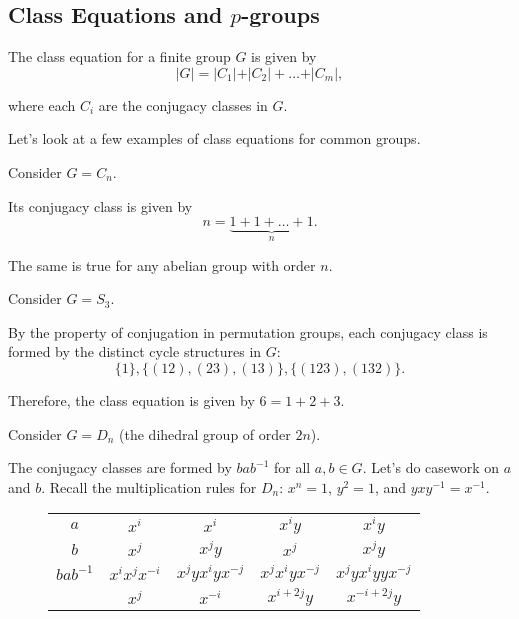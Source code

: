 \subsection{Class Equations and $p$-groups}

\begin{definition}

The \ac{class equation} for a finite group $G$ is given by 
\[\vert G\vert = \vert C_1\vert + \vert C_2 \vert + \hdots + \vert C_m\vert,\]

where each $C_i$ are the conjugacy classes in $G$. 
\end{definition}

Let's look at a few examples of class equations for common groups.
\begin{example}
\exlabel

Consider $G = C_n$. 
\end{example}

Its conjugacy class is given by
\[n = \underbrace{1 + 1 + \hdots + 1}_n.\]

The same is true for any abelian group with order $n$. 

\begin{example}
\exlabel

Consider $G = S_3$. 
\end{example}

By the property of conjugation in permutation groups, each conjugacy class is formed by the distinct cycle structures in $G$: 
\[\{1\}, \{(12), (23), (13)\}, \{(123), (132)\}.\]

Therefore, the class equation is given by $6 = 1+2+3$. 

\begin{example}
\exlabel

Consider $G = D_n$ (the dihedral group of order $2n$). 
\end{example}

The conjugacy classes are formed by $bab^{-1}$ for all $a,b\in G$. Let's do casework on $a$ and $b$. Recall the multiplication rules for $D_n$: $x^n = 1$, $y^2 = 1$, and $yxy^{-1} = x^{-1}$. 

\begin{figure}[h]
\centering
\begin{tabular}{|c|c|c|c|c|}

    $a$ & $x^i$ & $x^i$ & $x^iy$ & $x^iy$ \\

    $b$ & $x^j$ & $x^jy$ & $x^j$ & $x^jy$ \\
    \hline
$bab^{-1}$ & $x^ix^jx^{-i}$ & $x^jyx^iyx^{-j}$ & $x^jx^iyx^{-j}$ & $x^jyx^iyyx^{-j}$\\
 & $x^j$ & $x^{-i}$ & $x^{i+2j}y$ & $x^{-i+2j}y$
\end{tabular}
\end{figure}

